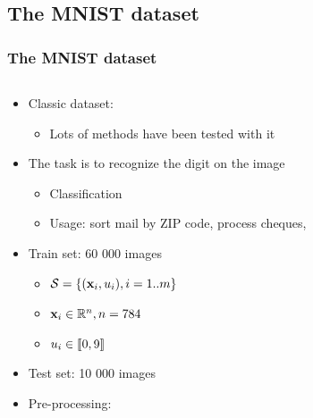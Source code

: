 \subsection{The MNIST dataset}

\begin{frame}

  \frametitle{The MNIST dataset}

  \begin{columns}
    \begin{column}{0.5\textwidth}
      \begin{itemize}
      \item Classic dataset:
        \begin{itemize}
        \item Lots of methods have been tested with it
        \end{itemize}
      \item<2-> The task is to recognize the digit on the image
        \begin{itemize}
        \item Classification
        \item Usage: sort mail by ZIP code, process cheques, \etc{}
        \end{itemize}
      \item<3-> Train set: 60 000 images
        \begin{itemize}
        \item $\mathcal{S} =
          \left \lbrace {\ensuremath{\left ( {\mathbf{x}_{i}}, {u_{i}} \right )}} , {i=1..m} \right \rbrace$
        \item $\mathbf{x}_i \in \mathbb{R}^{n}, n = 784$
        \item $u_i \in \left \llbracket {0}, {9} \right \rrbracket$
        \end{itemize}
      \item<3-> Test set: 10 000 images
      \item<4-> Pre-processing:
        \begin{itemize}

\end{itemize}
\end{itemize}
\end{column}
\end{columns}
\end{frame}
